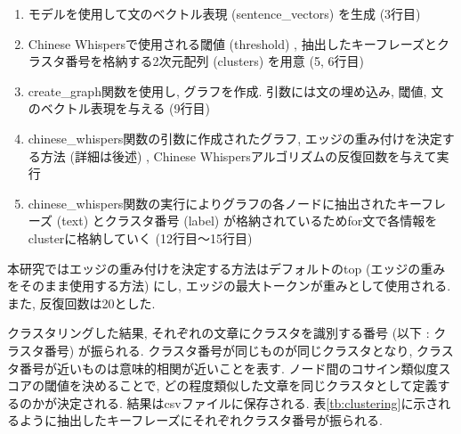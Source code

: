 \begin{enumerate}
  \item モデルを使用して文のベクトル表現 (sentence\_vectors) を生成 (3行目) 
  \item Chinese Whispersで使用される閾値 (threshold) , 抽出したキーフレーズとクラスタ番号を格納する2次元配列 (clusters) を用意 (5, 6行目)
  \item create\_graph関数を使用し, グラフを作成. 引数には文の埋め込み, 閾値, 文のベクトル表現を与える (9行目)
  \item chinese\_whispers関数の引数に作成されたグラフ, エッジの重み付けを決定する方法 (詳細は後述) , Chinese Whispersアルゴリズムの反復回数を与えて実行
  \item chinese\_whispers関数の実行によりグラフの各ノードに抽出されたキーフレーズ (text) とクラスタ番号 (label) が格納されているためfor文で各情報をclusterに格納していく (12行目〜15行目)
\end{enumerate}

本研究ではエッジの重み付けを決定する方法はデフォルトのtop (エッジの重みをそのまま使用する方法) にし, エッジの最大トークンが重みとして使用される. また, 反復回数は20とした. 

クラスタリングした結果, それぞれの文章にクラスタを識別する番号 (以下 : クラスタ番号) が振られる. クラスタ番号が同じものが同じクラスタとなり, クラスタ番号が近いものは意味的相関が近いことを表す. ノード間のコサイン類似度スコアの閾値を決めることで, どの程度類似した文章を同じクラスタとして定義するのかが決定される. 
結果はcsvファイルに保存される. 表\ref{tb:clustering}に示されるように抽出したキーフレーズにそれぞれクラスタ番号が振られる. 

